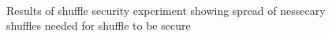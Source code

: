 \begin{figure}[!htb]
    \centering
    \\[-2pt]
    \\[-2pt]
    \\[-2pt]
    \caption{Results of shuffle security experiment showing spread of nessecary shuffles needed for shuffle to be secure}%
    \label{fig:shufflesecurityviolin}%
\end{figure}

